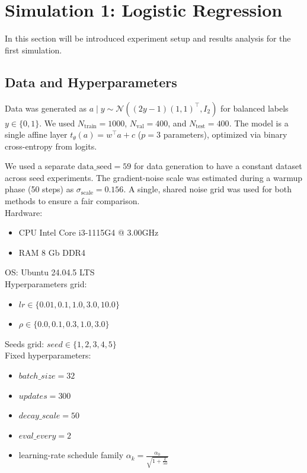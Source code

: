 \section{Simulation 1: Logistic Regression}

In this section will be introduced experiment setup and results analysis for the first simulation.


\subsection{Data and Hyperparameters}
Data was generated as \(a \mid y \sim \mathcal{N}((2y - 1)(1, 1)^\top, I_2)\) for balanced labels \(y \in \{0, 1\}\). We used \(N_{\text{train}}=1000\), \(N_{\text{val}}=400\), and \(N_{\text{test}}=400\). The model is a single affine layer \(t_\theta(a) = w^\top a + c\) (\(p=3\) parameters), optimized via binary cross-entropy from logits. 

We used a separate $\text{data\_seed}=59$ for data generation to have a constant dataset across seed experiments.
The gradient-noise scale was estimated during a warmup phase (50 steps) as \(\sigma_{\text{scale}} = 0.156\). A single, shared noise grid was used for both methods to ensure a fair comparison. 
\\
Hardware: 
 \begin{itemize}
    \item CPU Intel Core i3-1115G4 @ 3.00GHz
    \item RAM 8 Gb DDR4
 \end{itemize}
OS: Ubuntu 24.04.5 LTS
\\
Hyperparameters grid:
\begin{itemize}
    \item \(lr \in \{0.01, 0.1, 1.0, 3.0, 10.0\}\)
    \item \(\rho \in \{0.0, 0.1, 0.3, 1.0, 3.0\}\)     
\end{itemize}

Seeds grid: \(seed \in \{1, 2, 3, 4, 5\}\)
\\

Fixed hyperparameters:
\begin{itemize}
    \item \(batch\_size = 32\)
    \item \(updates = 300\)
    \item \(decay\_scale = 50\)
    \item \(eval\_every = 2\)
    \item learning-rate schedule family \(\alpha_k = \frac{\alpha_0}{\sqrt{1+\frac{k}{50}}}\)
\end{itemize}

